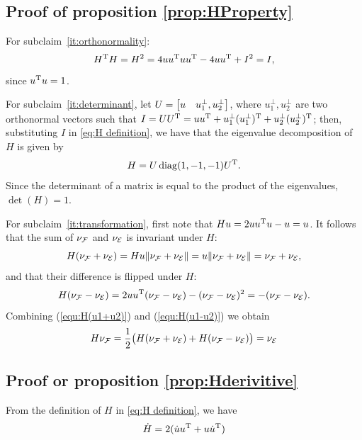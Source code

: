 \documentclass[journal]{IEEEtran}  %
\begin{document}
\appendix


\subsection{Proof of proposition \ref{prop:HProperty}} \label{proof:HProperty}
    For subclaim~\ref{it:orthonormality}:
    \begin{equation}
      H^\mathrm{T} H=H^2=4uu^\mathrm{T} u u^\mathrm{T} - 4uu^\mathrm{T} +I^2=I,
    \end{equation}
    since $u^\mathrm{T} u=1$.

    For subclaim~\ref{it:determinant}, let $U=\begin{bmatrix}u & u^\bot_{1},u^\bot_{2}\end{bmatrix}$, where $u^\bot_{1},u^\bot_{2}$ are two orthonormal vectors such that $I=UU^\mathrm{T}=uu^\mathrm{T} + u^\bot_{1}(u^\bot_{1})^\mathrm{T}+u^\bot_{2}(u^\bot_{2})^\mathrm{T}$; then, substituting $I$ in \eqref{eq:H definition}, we have that the eigenvalue decomposition of $H$ is given by
    \begin{equation}
      H=U\operatorname{diag}(1,-1,-1) U^\mathrm{T}.
    \end{equation}
    Since the determinant of a matrix is equal to the product of the eigenvalues, $\det(H)=1$.

    For subclaim~\ref{it:transformation}, first note that $Hu=2uu^\mathrm{T} u - u=u$.
    It follows that the sum of $\nu_{\mathcal{F}}$ and $\nu_{\mathcal{E}}$ is invariant under $H$:
    \begin{equation}\label{equ:H(u1+u2)}
      H(\nu_{\mathcal{F}}+\nu_{\mathcal{E}})=H u \lVert\nu_{\mathcal{F}}+\nu_{\mathcal{E}}\rVert
      = u\lVert\nu_{\mathcal{F}}+\nu_{\mathcal{E}}\rVert =\nu_{\mathcal{F}}+\nu_{\mathcal{E}},
    \end{equation}
    and that their difference is flipped under $H$:
    \begin{equation}\label{equ:H(u1-u2)}
      H(\nu_{\mathcal{F}}-\nu_{\mathcal{E}}) = 2uu^\mathrm{T} (\nu_{\mathcal{F}}-\nu_{\mathcal{E}}) - (\nu_{\mathcal{F}}-\nu_{\mathcal{E}})^2 = -(\nu_{\mathcal{F}}-\nu_{\mathcal{E}}).
    \end{equation}
    Combining (\ref{equ:H(u1+u2)}) and (\ref{equ:H(u1-u2)}) we obtain
    \begin{equation}
      H\nu_{\mathcal{F}} = \frac{1}{2}\bigl(H(\nu_{\mathcal{F}}+\nu_{\mathcal{E}})+H(\nu_{\mathcal{F}}-\nu_{\mathcal{E}})\bigr)
      = \nu_{\mathcal{E}}
    \end{equation}

\subsection{Proof or proposition \ref{prop:Hderivitive}} \label{proof:Hderivitive}
    From the definition of $H$ in \eqref{eq:H definition}, we have
    \begin{equation} \label{equ:H_dot original}
      \dot H =   2(\dot u u^\mathrm{T} + u \dot u^\mathrm{T})
    \end{equation}
\end{document}
